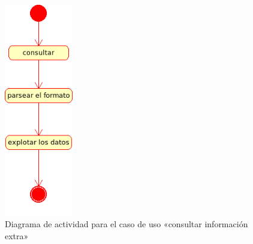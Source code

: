 \begin{figure}[ht]
 	\centering
	\includegraphics[width=3cm]{images/uml/casos-uso/consultar-extra.png}
	\caption{Diagrama de actividad para el caso de uso «consultar información extra»}
	\label{fig:uml:consultar-extra}
\end{figure}

